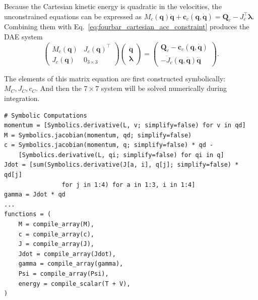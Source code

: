 Because the Cartesian kinetic energy is quadratic in the velocities, the unconstrained equations can be expressed as $M_c(\mathbf q)\ddot{\mathbf q}+\mathbf c_c(\mathbf q,\dot{\mathbf q})=\mathbf Q_c-J_c^\top\boldsymbol\lambda$. Combining them with Eq.~\eqref{eq:fourbar_cartesian_acc_constraint} produces the DAE system
\begin{equation}
    \boxed{
    \begin{pmatrix}
        M_c(\mathbf q)&J_c(\mathbf q)^\top\\
        J_c(\mathbf q)&0_{3\times3}
    \end{pmatrix}
    \begin{pmatrix}
        \ddot{\mathbf q}\\\boldsymbol\lambda
    \end{pmatrix}
    =\begin{pmatrix}
        \mathbf Q_c-\mathbf c_c(\mathbf q,\dot{\mathbf q})\\
        -\dot J_c(\mathbf q,\dot{\mathbf q})\dot{\mathbf q}
    \end{pmatrix}.}
    \label{eq:fourbar_dae_block}
\end{equation}

The elements of this matrix equation are first constructed symbolically: $M_C, J_C, c_C$. And then the $7 \times 7$
system will be solved numerically during integration.

\begin{verbatim}
# Symbolic Computations
momentum = [Symbolics.derivative(L, v; simplify=false) for v in qd]
M = Symbolics.jacobian(momentum, qd; simplify=false)
c = Symbolics.jacobian(momentum, q; simplify=false) * qd -
    [Symbolics.derivative(L, qi; simplify=false) for qi in q]
Jdot = [sum(Symbolics.derivative(J[a, i], q[j]; simplify=false) * qd[j]
                for j in 1:4) for a in 1:3, i in 1:4]
gamma = Jdot * qd
...
functions = (
    M = compile_array(M),
    c = compile_array(c),
    J = compile_array(J),
    Jdot = compile_array(Jdot),
    gamma = compile_array(gamma),
    Psi = compile_array(Psi),
    energy = compile_scalar(T + V),
)
\end{verbatim}

